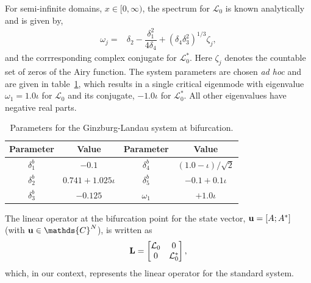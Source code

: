 For semi-infinite domains, $x\in[0,\infty)$, the spectrum for $\mathcal{L}_{0}$ is known analytically \citep{chomaz88} and is given by,
	\begin{align}
		\omega_{j}	=& \delta_{2} - \dfrac{\delta_{1}^{2}}{4\delta_{4}} + (\delta_{4}\delta_{3}^{2})^{1/3}\zeta_{j}, \label{eqn:eigenvalues} 
	\end{align}
and the corrresponding complex conjugate for $\mathcal{L}^{*}_{0}$. Here $\zeta_{j}$ denotes the countable set of zeros of the Airy function. The system parameters are chosen \emph{ad hoc} and are given in table~\ref{table:GL_bifurcation_params}, which results in a single critical eigenmode with eigenvalue $\omega_{1} = 1.0\iota$ for $\mathcal{L}_{0}$ and its conjugate, $-1.0\iota$ for $\mathcal{L}^{*}_{0}$. All other eigenvalues have negative real parts. 
\begin{table}[h]
	\renewcommand{\arraystretch}{1.5}
	\begin{tabular}{cc|cc}
			Parameter & Value & Parameter & Value \\
			\hline
			\hline
			$\delta^{b}_{1}$ & $-0.1$  & $\delta^{b}_{4}$ & $(1.0 - \iota)/\sqrt{2}$ \\
			\hline
			 $\delta^{b}_{2}$ & $0.741 + 1.025\iota$ & $\delta^{b}_{5}$ & $-0.1+0.1\iota$ \\
			 \hline
			$\delta^{b}_{3}$ & $-0.125$ &  $\omega_{1}$ & $+1.0\iota$ \\
			\hline	
			\hline
		\end{tabular}
		\caption{Parameters for the Ginzburg-Landau system at bifurcation.}
		\label{table:GL_bifurcation_params} 
\end{table}
 The linear operator at the bifurcation point for the state vector, $\mathbf{u} = [A; A^{*}]$ (with $\vecu\in\mathds{C}^{N}$), is written as
\begin{eqnarray}
	\mathbf{L} = \begin{bmatrix}
		\mathcal{L}_{0}		& 0 \\
		0								  & \mathcal{L}^{*}_{0}
	\end{bmatrix},
\end{eqnarray}
which, in our context, represents the linear operator for the standard system. 
 
